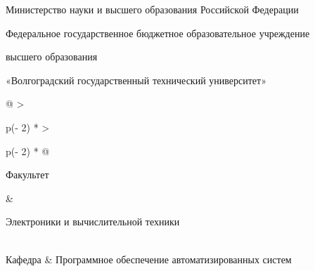 Министерство науки и высшего образования Российской Федерации

Федеральное государственное бюджетное образовательное учреждение

высшего образования

«Волгоградский государственный технический университет»

\begin{longtable}[]{@{}
  >{\raggedright\arraybackslash}p{(\columnwidth - 2\tabcolsep) * }
  >{\raggedright\arraybackslash}p{(\columnwidth - 2\tabcolsep) * }@{}}
\toprule\noalign{}
\begin{minipage}[b]{\linewidth}\raggedright
Факультет
\end{minipage} & \begin{minipage}[b]{\linewidth}\raggedright
Электроники и вычислительной техники
\end{minipage} \\
\midrule\noalign{}
\endhead
\bottomrule\noalign{}
\endlastfoot
Кафедра & Программное обеспечение автоматизированных систем \\
\end{longtable}

